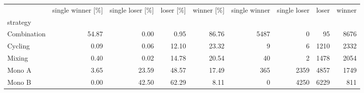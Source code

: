 \begin{tabular}{lrrrrrrrr}
\toprule
 & single winner [\%] & single loser [\%] & loser [\%] & winner [\%] & single winner & single loser & loser & winner \\
strategy &  &  &  &  &  &  &  &  \\
\midrule
Combination & 54.87 & 0.00 & 0.95 & 86.76 & 5487 & 0 & 95 & 8676 \\
Cycling & 0.09 & 0.06 & 12.10 & 23.32 & 9 & 6 & 1210 & 2332 \\
Mixing & 0.40 & 0.02 & 14.78 & 20.54 & 40 & 2 & 1478 & 2054 \\
Mono A & 3.65 & 23.59 & 48.57 & 17.49 & 365 & 2359 & 4857 & 1749 \\
Mono B & 0.00 & 42.50 & 62.29 & 8.11 & 0 & 4250 & 6229 & 811 \\
\bottomrule
\end{tabular}
